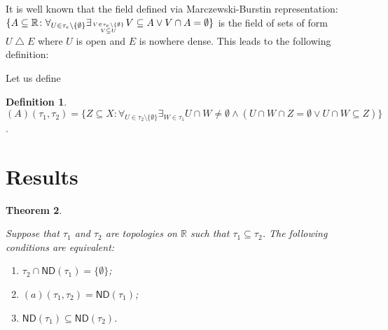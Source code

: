 \documentclass[12pt]{amsart}
\theoremstyle{plain}
\newtheorem{theorem}{Theorem}[section]
\theoremstyle{definition}
\newtheorem{definition}[theorem]{Definition}
\theoremstyle{remark}
\newcommand{\real}{\mathbb{R}}
\newcommand{\cK}{{\mathcal K}}
\newcommand{\mathint}{\mathit{int}}
\newcommand{\aideal}{\mathit{(a)}}
\begin{document}
It is well known that the field defined via
Marczewski-Burstin representation:
$\lbrace A \subseteq \real\colon 
\forall_{U \in \tau_e \setminus \lbrace \emptyset \rbrace}
\exists_{V \in \tau_e \setminus \lbrace \emptyset \rbrace \atop V \subseteq U}
V \subseteq A \vee V \cap A = \emptyset\rbrace$
is the field of sets of form $U \bigtriangleup E$
where $U$ is open and $E$ is nowhere dense.
This leads to the following definition:

Let us define 
\begin{definition}
$(A)(\tau_1, \tau_2) = \{ Z \subseteq X \colon
\forall_{U \in \tau_2 \setminus \{ \emptyset\}}
\exists_{W \in \tau_1} U \cap W \not= \emptyset \wedge
(U \cap W \cap Z = \emptyset \vee U \cap W \subseteq Z)\}$.
\end{definition}

\section{Results}

\begin{theorem}
\label{collapse-theorem}

Suppose that $\tau_1$ and $\tau_2$ are topologies on $\real$ such
that $\tau_1 \subseteq \tau_2$.
The following conditions are equivalent:
\begin{enumerate}
\item $\tau_2 \cap \mathsf{ND}(\tau_1) = \lbrace \emptyset \rbrace$;
\item $\aideal(\tau_1, \tau_2) = \mathsf{ND}(\tau_1)$;
\item $\mathsf{ND}(\tau_1) \subseteq \mathsf{ND}(\tau_2)$.
\end{enumerate}
\end{theorem}
									
\end{document}
